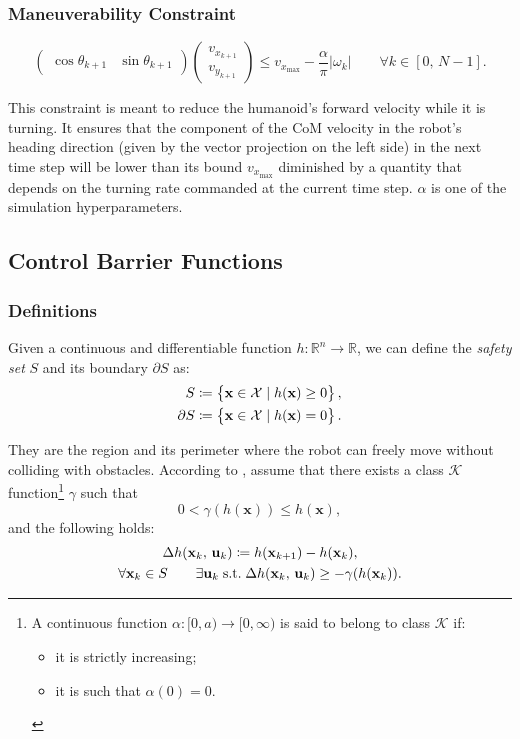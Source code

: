 \subsubsection{Maneuverability Constraint}
\[
\begin{pmatrix}
\cos \theta_{k+1} & \sin \theta_{k+1}
\end{pmatrix}
\begin{pmatrix}
v_{x_{k+1}} \\
v_{y_{k+1}}
\end{pmatrix}
\leq v_{x_{\max}} - \frac{\alpha}{\pi} |\omega_k|
\qquad \forall k \in \left[0,\, N-1 \right].
\]

This constraint is meant to reduce the humanoid's forward velocity while it is turning. It ensures that the component of the CoM velocity in the robot's heading direction (given by the vector projection on the left side) in the next time step will be lower than its bound $v_{x_{\max}}$ diminished by a quantity that depends on the turning rate commanded at the current time step. $\alpha$ is one of the simulation hyperparameters.

\subsection{Control Barrier Functions}

\subsubsection{Definitions}
Given a continuous and differentiable function $h: \mathbb{R}^n \rightarrow \mathbb{R}$, we can define the \textit{safety set} $S$ and its boundary $\partial S$ as:
\begin{align*}
S \coloneqq \left\{ \mathbf{x} \in \mathcal{X} \mid  h(\mathbf{x}) \geq 0\right\}, \notag \\
\partial S \coloneqq \left\{ \mathbf{x} \in \mathcal{X} \mid  h(\mathbf{x}) = 0\right\}. \notag  \\
\end{align*}

They are the region and its perimeter where the robot can freely move without colliding with obstacles.
According to \cite{zeng2021safetycriticalmodelpredictivecontrol}, %
assume that there exists a class $\mathcal{K}$ function\footnote{A continuous function $\alpha \colon [0, a) \to  [0, \infty)$ is said to belong to class $\mathcal{K}$ if: 
\begin{itemize}
    \item it is strictly increasing;
    \item it is such that $\alpha(0) = 0$.
\end{itemize}
} $\gamma$ such that
$$
0 < \gamma(h(\mathbf{x})) \leq h(\mathbf{x}),
$$
and the following holds:
\begin{gather}
\Delta h(\mathbf{x}_k,\, \mathbf{u}_k) \coloneqq h(\mathbf{x}_{k+1}) - h(\mathbf{x}_{k}), \notag \\
\forall \mathbf{x}_k \in S \qquad \exists \mathbf{u}_k \; \text{s.t.} \; \Delta h(\mathbf{x}_k,\, \mathbf{u}_k) \geq -\gamma(h(\mathbf{x}_k)). \label{eq:dcbf_def_constr}
\end{gather}

